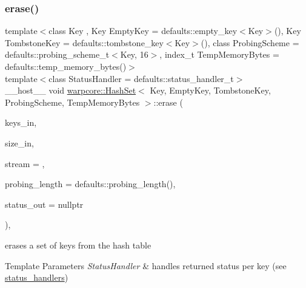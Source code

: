 \subsubsection{\texorpdfstring{erase()}{erase()}\hspace{0.1cm}{\footnotesize\ttfamily [2/2]}}
{\footnotesize\ttfamily template$<$class Key , Key Empty\+Key = defaults\+::empty\+\_\+key$<$\+Key$>$(), Key Tombstone\+Key = defaults\+::tombstone\+\_\+key$<$\+Key$>$(), class Probing\+Scheme  = defaults\+::probing\+\_\+scheme\+\_\+t$<$\+Key, 16$>$, index\+\_\+t Temp\+Memory\+Bytes = defaults\+::temp\+\_\+memory\+\_\+bytes()$>$ \\
template$<$class Status\+Handler  = defaults\+::status\+\_\+handler\+\_\+t$>$ \\
\+\_\+\+\_\+host\+\_\+\+\_\+ void \hyperlink{classwarpcore_1_1HashSet}{warpcore\+::\+Hash\+Set}$<$ Key, Empty\+Key, Tombstone\+Key, Probing\+Scheme, Temp\+Memory\+Bytes $>$\+::erase (\begin{DoxyParamCaption}\item[{key\+\_\+type $\ast$}]{keys\+\_\+in,  }\item[{index\+\_\+type}]{size\+\_\+in,  }\item[{cuda\+Stream\+\_\+t}]{stream = {},  }\item[{index\+\_\+type}]{probing\+\_\+length = {\ttfamily defaults\+:\+:probing\+\_\+length()},  }\item[{typename Status\+Handler\+::base\+\_\+type $\ast$}]{status\+\_\+out = {\ttfamily nullptr} }\end{DoxyParamCaption})\hspace{0.3cm}{\ttfamily [inline]}, {\ttfamily [noexcept]}}



erases a set of keys from the hash table 


\begin{DoxyTemplParams}{Template Parameters}
{\em Status\+Handler} & handles returned status per key (see {\ttfamily \hyperlink{namespacewarpcore_1_1status__handlers}{status\+\_\+handlers}}) \\
\hline
\end{DoxyTemplParams}


